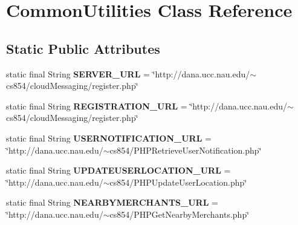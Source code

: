 \hypertarget{classapp_1_1utilities_1_1_common_utilities}{\section{Common\-Utilities Class Reference}
\label{classapp_1_1utilities_1_1_common_utilities}
}
\subsection*{Static Public Attributes}
\begin{DoxyCompactItemize}
\item 
\hypertarget{classapp_1_1utilities_1_1_common_utilities_acd97eb519a94f326404d38eecc610827}{static final String {\bfseries S\-E\-R\-V\-E\-R\-\_\-\-U\-R\-L} = \char`\"{}http\-://dana.\-ucc.\-nau.\-edu/$\sim$cs854/cloud\-Messaging/register.\-php\char`\"{}}\label{classapp_1_1utilities_1_1_common_utilities_acd97eb519a94f326404d38eecc610827}

\item 
\hypertarget{classapp_1_1utilities_1_1_common_utilities_a1c3184ffa9122f09d8700e96f45bfe55}{static final String {\bfseries R\-E\-G\-I\-S\-T\-R\-A\-T\-I\-O\-N\-\_\-\-U\-R\-L} = \char`\"{}http\-://dana.\-ucc.\-nau.\-edu/$\sim$cs854/cloud\-Messaging/register.\-php\char`\"{}}\label{classapp_1_1utilities_1_1_common_utilities_a1c3184ffa9122f09d8700e96f45bfe55}

\item 
\hypertarget{classapp_1_1utilities_1_1_common_utilities_a206208bfd9a5a794cd6525b554bc83cb}{static final String {\bfseries U\-S\-E\-R\-N\-O\-T\-I\-F\-I\-C\-A\-T\-I\-O\-N\-\_\-\-U\-R\-L} = \char`\"{}http\-://dana.\-ucc.\-nau.\-edu/$\sim$cs854/P\-H\-P\-Retrieve\-User\-Notification.\-php\char`\"{}}\label{classapp_1_1utilities_1_1_common_utilities_a206208bfd9a5a794cd6525b554bc83cb}

\item 
\hypertarget{classapp_1_1utilities_1_1_common_utilities_a13b89be84e18ade2d407fa180c513ca7}{static final String {\bfseries U\-P\-D\-A\-T\-E\-U\-S\-E\-R\-L\-O\-C\-A\-T\-I\-O\-N\-\_\-\-U\-R\-L} = \char`\"{}http\-://dana.\-ucc.\-nau.\-edu/$\sim$cs854/P\-H\-P\-Update\-User\-Location.\-php\char`\"{}}\label{classapp_1_1utilities_1_1_common_utilities_a13b89be84e18ade2d407fa180c513ca7}

\item 
\hypertarget{classapp_1_1utilities_1_1_common_utilities_a2f042264bdce8c42d690035309eddde3}{static final String {\bfseries N\-E\-A\-R\-B\-Y\-M\-E\-R\-C\-H\-A\-N\-T\-S\-\_\-\-U\-R\-L} = \char`\"{}http\-://dana.\-ucc.\-nau.\-edu/$\sim$cs854/P\-H\-P\-Get\-Nearby\-Merchants.\-php\char`\"{}}\label{classapp_1_1utilities_1_1_common_utilities_a2f042264bdce8c42d690035309eddde3}


\end{DoxyCompactItemize}
